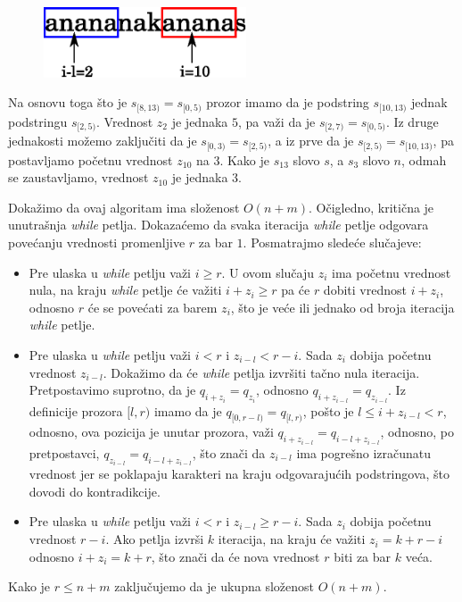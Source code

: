 \begin{figure}[H]
    \centering
    \includegraphics[width=60mm]{../img/zalgo1.eps}
\end{figure}

Na osnovu toga \v sto je $s_{[8,13)} = s_{[0,5)}$ prozor imamo da je podstring $s_{[10,13)}$ jednak podstringu $s_{[2,5)}$. Vrednost $z_2$ je jednaka $5$, pa va\v zi da je $s_{[2,7)} = s_{[0,5)}$. Iz druge jednakosti mo\v zemo zaklju\v citi da je $s_{[0,3)} = s_{[2,5)}$, a iz prve da je $s_{[2,5)} = s_{[10,13)}$, pa postavljamo po\v cetnu vrednost $z_{10}$ na $3$. Kako je $s_{13}$ slovo $s$, a $s_3$ slovo $n$, odmah se zaustavljamo, vrednost $z_{10}$ je jednaka $3$.

Doka\v zimo da ovaj algoritam ima slo\v zenost $O(n+m)$. O\v cigledno, kriti\v cna je unutra\v snja \textit{while} petlja. Dokaza\' cemo da svaka iteracija \textit{while} petlje odgovara pove\' canju vrednosti promenljive $r$ za bar $1$. Posmatrajmo slede\' ce slu\v cajeve:

\begin{itemize}
\item Pre ulaska u \textit{while} petlju va\v zi $i \geq r$. U ovom slu\v caju $z_i$ ima po\v cetnu vrednost nula, na kraju \textit{while} petlje \' ce va\v ziti $i + z_i \geq r$ pa \' ce $r$ dobiti vrednost $i + z_i$, odnosno $r$ \' ce se pove\' cati za barem $z_i$, \v sto je ve\'ce ili jednako od broja iteracija \textit{while} petlje.
\item Pre ulaska u \textit{while} petlju va\v zi $i < r$ i $z_{i-l} < r-i$. Sada $z_i$ dobija po\v cetnu vrednost $z_{i-l}$. Doka\v zimo da \' ce \textit{while} petlja izvr\v siti ta\v cno nula iteracija. Pretpostavimo suprotno, da je $q_{i+z_i} = q_{z_i}$, odnosno $q_{i+z_{i-l}} = q_{z_{i-l}}$. Iz definicije prozora $[l, r)$ imamo da je $q_{[0, r-l)} = q_{[l, r)}$, po\v sto je $l \leq i+z_{i-l} < r$, odnosno, ova pozicija je unutar prozora, va\v zi $q_{i+z_{i-l}} = q_{i-l+z_{i-l}}$, odnosno, po pretpostavci, $q_{z_{i-l}} = q_{i-l+z_{i-l}}$, \v sto zna\v ci da $z_{i-l}$ ima pogre\v sno izra\v cunatu vrednost jer se poklapaju karakteri na kraju odgovaraju\' cih podstringova, \v sto dovodi do kontradikcije.
\item Pre ulaska u \textit{while} petlju va\v zi $i < r$ i $z_{i-l} \geq r-i$. Sada $z_i$ dobija po\v cetnu vrednost $r-i$. Ako petlja izvr\v si $k$ iteracija, na kraju \' ce va\v ziti $z_i=k+r-i$ odnosno $i+z_i=k+r$, \v sto zna\v ci da \' ce nova vrednost $r$ biti za bar $k$ ve\' ca.
\end{itemize}

Kako je $r \leq n+m$ zaklju\v cujemo da je ukupna slo\v zenost $O(n+m)$.
